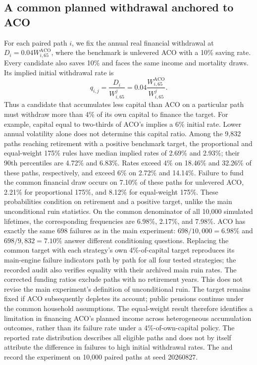 \subsection{A common planned withdrawal anchored to ACO}
\label{app:common-withdrawal}
For each paired path $i$, we fix the annual real financial withdrawal at
$D_i=0.04W^{\mathrm{ACO}}_{i,65}$, where the benchmark is unlevered ACO
with a 10\% saving rate. Every candidate also saves 10\% and faces the
same income and mortality draws. Its implied initial withdrawal rate is
\[
q_{i,j}=\frac{D_i}{W^j_{i,65}}
       =0.04\frac{W^{\mathrm{ACO}}_{i,65}}{W^j_{i,65}}.
\]
Thus a candidate that accumulates less capital than ACO on a particular
path must withdraw more than 4\% of its own capital to finance the target.
For example, capital equal to two-thirds of ACO's implies a 6\% initial
rate. Lower annual volatility alone does not determine this capital ratio.
Among the 9,832 paths reaching retirement with a positive benchmark target,
the proportional and equal-weight 175\% rules have median implied rates
of 2.69\% and 2.93\%; their 90th percentiles are 4.72\% and 6.83\%.
Rates exceed 4\% on 18.46\% and 32.26\% of these paths, respectively,
and exceed 6\% on 2.72\% and 14.14\%.
Failure to fund the common financial draw occurs on 7.10\% of these paths
for unlevered ACO, 2.21\% for proportional 175\%, and 8.12\% for
equal-weight 175\%. These probabilities condition on retirement and a
positive target, unlike the main unconditional ruin statistics.
On the common denominator of all 10,000 simulated lifetimes, the corresponding
frequencies are 6.98\%, 2.17\%, and 7.98\%. ACO has exactly the same
698 failures as in the main experiment: $698/10{,}000=6.98\%$ and
$698/9{,}832=7.10\%$ answer different conditioning questions. Replacing
the common target with each strategy's own 4\%-of-capital target reproduces
its main-engine failure indicators path by path for all four tested strategies;
the recorded audit also verifies equality with their archived main ruin rates.
The corrected funding ratios exclude paths with no retirement years. This
does not revise the main experiment's definition of unconditional ruin.
The target remains fixed if ACO subsequently depletes its account;
public pensions continue under the common household assumptions.
The equal-weight result therefore identifies a limitation in financing
ACO's planned income across heterogeneous accumulation outcomes, rather
than its failure rate under a 4\%-of-own-capital policy. The reported
rate distribution describes all eligible paths and does not by itself
attribute the difference in failures to high initial withdrawal rates.
The 
and 
record the experiment on 10,000 paired paths at seed 20260827.


